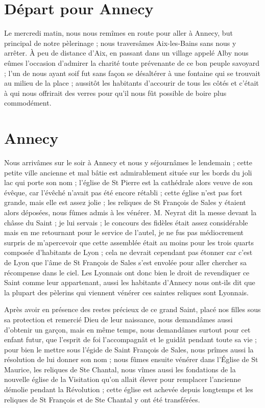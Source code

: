 \documentclass[11pt,a4paper]{report}
\begin{document}
\section*{Départ pour Annecy}

Le mercredi matin, nous nous remîmes en route pour aller à Annecy, but principal de notre pèlerinage ; nous traversâmes Aix-les-Bains sans nous y arrêter. À peu de distance d'Aix, en passant dans un village appelé Alby nous eûmes l'occasion d'admirer la charité toute prévenante de ce bon peuple savoyard ; l'un de nous ayant soif fut sans façon se désaltérer à une fontaine qui se trouvait au milieu de la place ; aussitôt les habitants d'accourir de tous les côtés et c'était à qui nous offrirait des verres pour qu'il nous fût possible de boire plus commodément.

\section*{Annecy}

Nous arrivâmes sur le soir à Annecy et nous y séjournâmes le lendemain ; cette petite ville ancienne et mal bâtie est admirablement située sur les bords du joli lac qui porte son nom ; l'église de St Pierre est la cathédrale alors veuve de son évêque, car l'évêché n'avait pas été encore rétabli ; cette église n'est pas fort grande, mais elle est assez jolie ; les reliques de St François de Sales y étaient alors déposées, nous fûmes admis à les vénérer. M. Neyrat dit la messe devant la châsse du Saint ; je lui servais ; le concours des fidèles était assez considérable mais en me retournant pour le service de l'autel, je ne fus pas médiocrement surpris de m'apercevoir que cette assemblée était au moins pour les trois quarts composée d'habitants de Lyon ; cela ne devrait cependant pas étonner car c'est de Lyon que l'âme de St François de Sales s'est envolée pour aller chercher sa récompense dans le ciel. Les Lyonnais ont donc bien le droit de revendiquer ce Saint comme leur appartenant, aussi les habitants d'Annecy nous ont-ils dit que la plupart des pèlerins qui viennent vénérer ces saintes reliques sont Lyonnais.

Après avoir en présence des restes précieux de ce grand Saint, placé nos filles sous sa protection et remercié Dieu de leur naissance, nous demandâmes aussi d'obtenir un garçon, mais en même temps, nous demandâmes surtout pour cet enfant futur, que l'esprit de foi l'accompagnât et le guidât pendant toute sa vie ; pour bien le mettre sous l'égide de Saint François de Sales, nous prîmes aussi la résolution de lui donner son nom ; nous fûmes ensuite vénérer dans l'Église de St Maurice, les reliques de Ste Chantal, nous vîmes aussi les fondations de la nouvelle église de la Visitation qu'on allait élever pour remplacer l'ancienne démolie pendant la Révolution ; cette église est achevée depuis longtemps et les reliques de St François et de Ste Chantal y ont été transférées.
\end{document}
